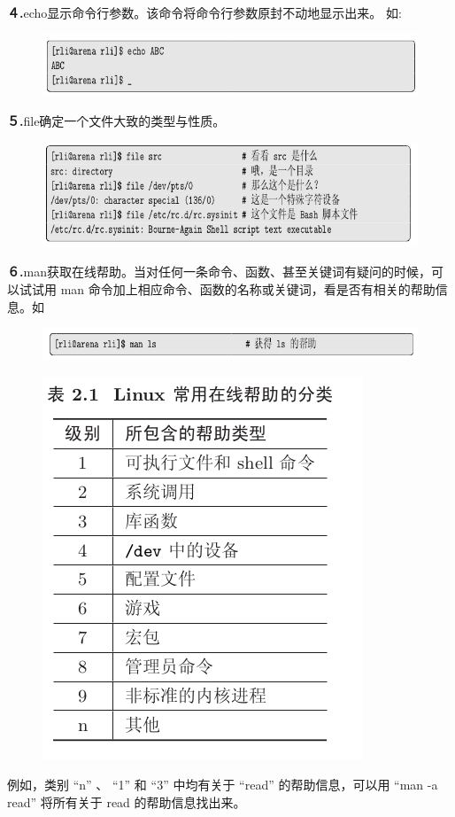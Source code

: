 \documentclass[12pt，a4paper]{article}
\numberwithin{equation}{section}
\begin{document}
\textbf{４.}echo显示命令行参数。该命令将命令行参数原封不动地显示出来。
如:
\begin{figure}[H]
\centering
\includegraphics[scale=0.6]{./figures/217.png}
\end{figure}

\textbf{５.}file确定一个文件大致的类型与性质。
\begin{figure}[H]
\centering
\includegraphics[scale=0.6]{./figures/218.png}
\end{figure}

\textbf{６.}man获取在线帮助。当对任何一条命令、函数、甚至关键词有疑问的时候，可以试试用 man 命令加上相应命令、函数的名称或关键词，看是否有相关的帮助信息。如
\begin{figure}[H]
\centering
\includegraphics[scale=0.6]{./figures/219.png}
\end{figure}

\begin{figure}[H]
\centering
\includegraphics[scale=0.6]{./figures/220.png}
\end{figure}
例如，类别 “n” 、 “1” 和 “3” 中均有关于 “read” 的帮助信息，可以用 “man -a read” 将所有关于 read 的帮助信息找出来。
\end{document}
